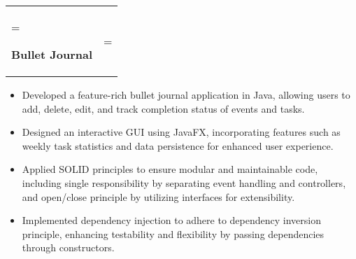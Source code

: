 \documentclass[letterpaper,11pt]{article}
\begin{document}
\begin{tabularx}{\textwidth}{ 
  >{\hsize=0.7\textwidth\linewidth=\textwidth\raggedright\arraybackslash}X 
  >{\hsize=0.3\textwidth\linewidth=\textwidth\raggedleft\arraybackslash}X}
  \hspace*{0.03mm} 
  {\textbf{Bullet Journal}}\\
\end{tabularx}
\vspace{-5mm}
\begin{itemize}[leftmargin=20pt, rightmargin=0cm]
    \item Developed a feature-rich bullet journal application in Java, allowing users to add, delete, edit, and track completion status of events and tasks.
    \item Designed an interactive GUI using JavaFX, incorporating features such as weekly task statistics and data persistence for enhanced user experience.
    \item Applied SOLID principles to ensure modular and maintainable code, including single responsibility by separating event handling and controllers, and open/close principle by utilizing interfaces for extensibility.
    \item Implemented dependency injection to adhere to dependency inversion principle, enhancing testability and flexibility by passing dependencies through constructors.
\end{itemize}


\end{document}
